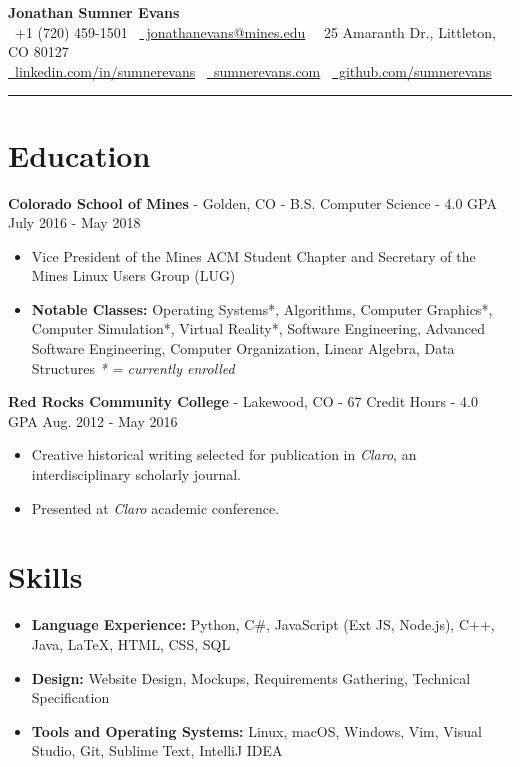\documentclass[10pt,letterpaper]{article}
\begin{document}
\begin{center}
    {\huge\textbf{Jonathan Sumner Evans}} \\
    \vspace{3pt}
    \faPhone\ +1 (720) 459-1501
    \textbar\ \href{mailto:jonathanevans@mines.edu}{\faEnvelope\ jonathanevans@mines.edu}
    \textbar\ \faHome\ 25 Amaranth Dr., Littleton, CO 80127 \\
    \href{https://www.linkedin.com/in/sumnerevans}{\faLinkedin\
    linkedin.com/in/sumnerevans}
    \textbar\ \href{http://sumnerevans.com}{\faGlobe\ sumnerevans.com}
    \textbar\ \href{https://github.com/sumnerevans}{\faGithub\
    github.com/sumnerevans}
    \rule{\textwidth}{0.5pt}
\end{center}

\section*{Education}
\textbf{Colorado School of Mines} - Golden, CO - B.S. Computer Science - 4.0 GPA
\hfill July 2016 - May 2018
\begin{itemize}
    \item Vice President of the Mines ACM Student Chapter and Secretary of the
        Mines Linux Users Group (LUG)
    \item \textbf{Notable Classes:} Operating Systems*, Algorithms, Computer
        Graphics*, Computer Simulation*, Virtual Reality*, Software Engineering,
        Advanced Software Engineering, Computer Organization, Linear Algebra,
        Data Structures \hfill\textit{* = currently enrolled}
\end{itemize}

\vspace{2pt}
\textbf{Red Rocks Community College} - Lakewood, CO - 67 Credit Hours - 4.0 GPA
\hfill Aug. 2012 - May 2016
\begin{itemize}
    \item Creative historical writing selected for publication in
        \textit{Claro}, an interdisciplinary scholarly journal.
    \item Presented at \textit{Claro} academic conference.
\end{itemize}

\section*{Skills}
{\renewcommand\labelitemi{}
    \renewcommand\leftmargini{0pt}
    \begin{itemize}
        \item \textbf{Language Experience:} Python, C\#, JavaScript (Ext JS,
            Node.js), C++, Java, {\selectfont\LaTeX}, HTML, CSS, SQL
        \item \textbf{Design:} Website Design, Mockups, Requirements Gathering,
            Technical Specification
        \item \textbf{Tools and Operating Systems:} Linux, macOS, Windows, Vim,
            Visual Studio, Git, Sublime Text, IntelliJ IDEA
    \end{itemize}
}
\end{document}
